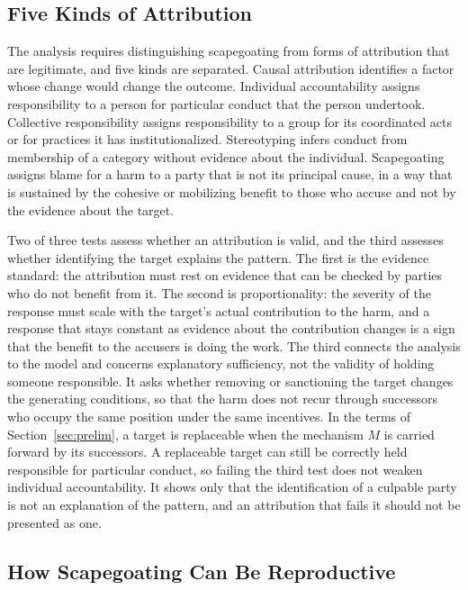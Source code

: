 \documentclass[12pt]{article}
\theoremstyle{remark}
\begin{document}
\subsection{Five Kinds of Attribution}

The analysis requires distinguishing scapegoating from forms of attribution that are legitimate, and five kinds are separated. Causal attribution identifies a factor whose change would change the outcome. Individual accountability assigns responsibility to a person for particular conduct that the person undertook. Collective responsibility assigns responsibility to a group for its coordinated acts or for practices it has institutionalized. Stereotyping infers conduct from membership of a category without evidence about the individual. Scapegoating assigns blame for a harm to a party that is not its principal cause, in a way that is sustained by the cohesive or mobilizing benefit to those who accuse and not by the evidence about the target.

Two of three tests assess whether an attribution is valid, and the third assesses whether identifying the target explains the pattern. The first is the evidence standard: the attribution must rest on evidence that can be checked by parties who do not benefit from it. The second is proportionality: the severity of the response must scale with the target's actual contribution to the harm, and a response that stays constant as evidence about the contribution changes is a sign that the benefit to the accusers is doing the work. The third connects the analysis to the model and concerns explanatory sufficiency, not the validity of holding someone responsible. It asks whether removing or sanctioning the target changes the generating conditions, so that the harm does not recur through successors who occupy the same position under the same incentives. In the terms of Section~\ref{sec:prelim}, a target is replaceable when the mechanism $M$ is carried forward by its successors. A replaceable target can still be correctly held responsible for particular conduct, so failing the third test does not weaken individual accountability. It shows only that the identification of a culpable party is not an explanation of the pattern, and an attribution that fails it should not be presented as one.

\subsection{How Scapegoating Can Be Reproductive}
\end{document}
